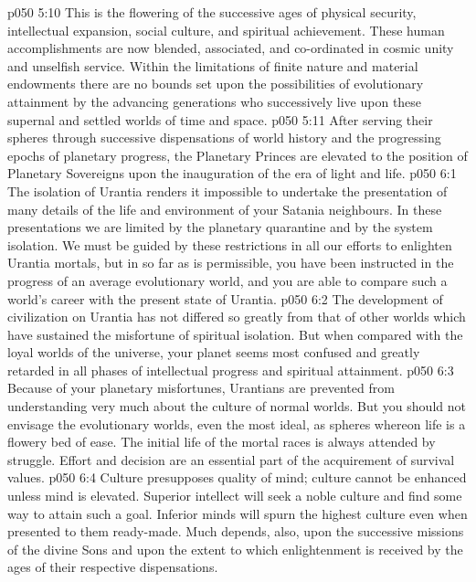 \vs p050 5:10 \bibnobreakspace {} This is the flowering of the successive ages of physical security, intellectual expansion, social culture, and spiritual achievement. These human accomplishments are now blended, associated, and co\hyp{}ordinated in cosmic unity and unselfish service. Within the limitations of finite nature and material endowments there are no bounds set upon the possibilities of evolutionary attainment by the advancing generations who successively live upon these supernal and settled worlds of time and space.
\vs p050 5:11 \pc After serving their spheres through successive dispensations of world history and the progressing epochs of planetary progress, the Planetary Princes are elevated to the position of Planetary Sovereigns upon the inauguration of the era of light and life.
\vs p050 6:1 The isolation of Urantia renders it impossible to undertake the presentation of many details of the life and environment of your Satania neighbours. In these presentations we are limited by the planetary quarantine and by the system isolation. We must be guided by these restrictions in all our efforts to enlighten Urantia mortals, but in so far as is permissible, you have been instructed in the progress of an average evolutionary world, and you are able to compare such a world’s career with the present state of Urantia.
\vs p050 6:2 The development of civilization on Urantia has not differed so greatly from that of other worlds which have sustained the misfortune of spiritual isolation. But when compared with the loyal worlds of the universe, your planet seems most confused and greatly retarded in all phases of intellectual progress and spiritual attainment.
\vs p050 6:3 Because of your planetary misfortunes, Urantians are prevented from understanding very much about the culture of normal worlds. But you should not envisage the evolutionary worlds, even the most ideal, as spheres whereon life is a flowery bed of ease. The initial life of the mortal races is always attended by struggle. Effort and decision are an essential part of the acquirement of survival values.
\vs p050 6:4 Culture presupposes quality of mind; culture cannot be enhanced unless mind is elevated. Superior intellect will seek a noble culture and find some way to attain such a goal. Inferior minds will spurn the highest culture even when presented to them ready\hyp{}made. Much depends, also, upon the successive missions of the divine Sons and upon the extent to which enlightenment is received by the ages of their respective dispensations.
